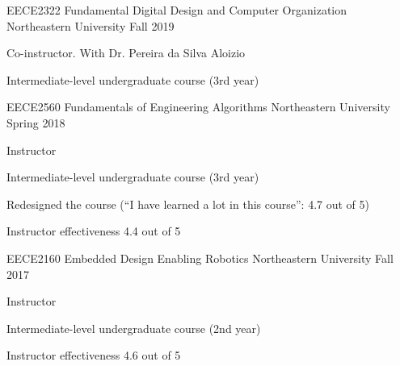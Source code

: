 \begin{cventries}

  \cvteaching
    {EECE2322}
    {Fundamental Digital Design and Computer Organization}
    {Northeastern University}
    {Fall 2019}
    {
        \item Co-instructor. With Dr. Pereira da Silva Aloizio
        \item Intermediate-level undergraduate course (3rd year)
    }

  \cvteaching
    {EECE2560}
    {Fundamentals of Engineering Algorithms}
    {Northeastern University}
    {Spring 2018}
    {
            \item Instructor
            \item Intermediate-level undergraduate course (3rd year)
            \item Redesigned the course (``I have learned a lot in this course'': 4.7 out of 5)
            \item Instructor effectiveness 4.4 out of 5
    }

  \cvteaching
    {EECE2160}
    {Embedded Design Enabling Robotics}
    {Northeastern University}
    {Fall 2017}
    {
            \item Instructor
            \item Intermediate-level undergraduate course (2nd year)
            \item Instructor effectiveness 4.6 out of 5
    }
    

\end{cventries}
